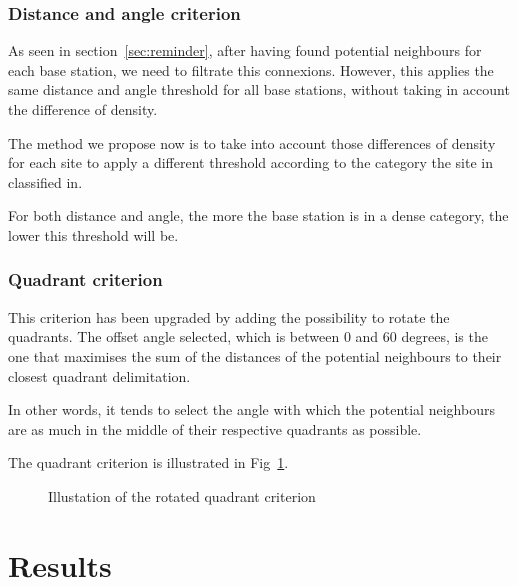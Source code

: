 \documentclass[lettersize,journal,english]{IEEEtran}
\begin{document}
        \subsubsection{Distance and angle criterion}
            As seen in section~\ref{sec:reminder}, after having found potential neighbours for each base station, we need to filtrate this connexions. However, this applies the same distance and angle threshold for all base stations, without taking in account the difference of density.

            The method we propose now is to take into account those differences of density for each site to apply a different threshold according to the category the site in classified in.

            For both distance and angle, the more the base station is in a dense category, the lower this threshold will be.

        \subsubsection{Quadrant criterion}
            This criterion has been upgraded by adding the possibility to rotate the quadrants. The offset angle selected, which is between $0$ and $60$ degrees, is the one that maximises the sum of the distances of the potential neighbours to their closest quadrant delimitation.

            In other words, it tends to select the angle with which the potential neighbours are as much in the middle of their respective quadrants as possible.

            The quadrant criterion is illustrated in Fig~\ref{fig:crit_qua}.
            \begin{figure}
                \centering
                \caption{Illustation of the rotated quadrant criterion}
                \label{fig:crit_qua}
            \end{figure}

\section{Results\label{sec:res}}
\end{document}
